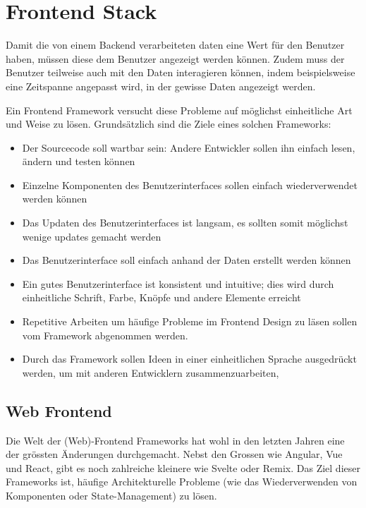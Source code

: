 \section{Frontend Stack}
\label{state:frontend}

Damit die von einem Backend verarbeiteten daten eine Wert für den Benutzer haben, müssen diese
dem Benutzer angezeigt werden können. Zudem muss der Benutzer teilweise auch mit den
Daten interagieren können, indem beispielsweise eine Zeitspanne angepasst wird, in
der gewisse Daten angezeigt werden. \parencite{anokhina_2019}

Ein Frontend Framework versucht diese Probleme auf möglichst einheitliche Art und Weise
zu lösen. Grundsätzlich sind die Ziele eines solchen Frameworks: \parencite{do-i-need-a-frontend-fwk}

\begin{itemize}
    \item Der Sourcecode soll wartbar sein: Andere Entwickler sollen ihn einfach lesen, ändern und testen können
    \item Einzelne Komponenten des Benutzerinterfaces sollen einfach wiederverwendet werden können
    \item Das Updaten des Benutzerinterfaces ist langsam, es sollten somit möglichst wenige updates gemacht werden
    \item Das Benutzerinterface soll einfach anhand der Daten erstellt werden können
    \item Ein gutes Benutzerinterface ist konsistent und intuitive; dies wird durch einheitliche Schrift, Farbe, Knöpfe und andere Elemente erreicht
    \item Repetitive Arbeiten um häufige Probleme im Frontend Design zu läsen sollen vom Framework abgenommen werden.
    \item Durch das Framework sollen Ideen in einer einheitlichen Sprache ausgedrückt werden, um mit anderen Entwicklern zusammenzuarbeiten,
\end{itemize}

\subsection{Web Frontend}

Die Welt der (Web)-Frontend Frameworks hat wohl in den letzten Jahren eine der grössten Änderungen
durchgemacht. Nebst den Grossen wie Angular, Vue und React, gibt es noch zahlreiche kleinere wie Svelte oder
Remix. Das Ziel dieser Frameworks ist, häufige Architekturelle Probleme (wie das Wiederverwenden von Komponenten
oder State-Management) zu lösen.\cite{do-i-need-a-frontend-fwk}

